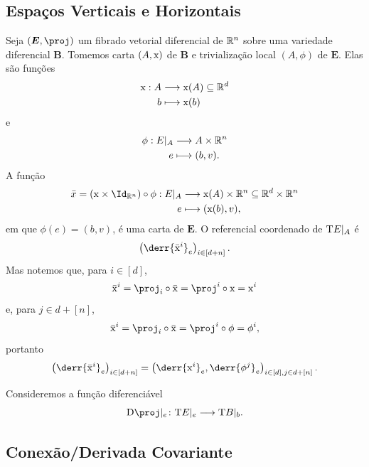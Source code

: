 \subsection{Espaços Verticais e Horizontais}

Seja $(\bm E,\proj)$ um fibrado vetorial diferencial de $\mathbb{R}^n$ sobre uma variedade diferencial $\bm B$. Tomemos carta $(A,\mathrm{x})$ de $\bm B$ e trivialização local $(A,\phi)$ de $\bm E$. Elas são funções
	\begin{align*}
	{\mathrm{x}}: {A} &\longrightarrow {\mathrm{x}(A) \subseteq \mathbb{R}^d} \\{b} &\longmapsto {\mathrm{x}(b)}
	\end{align*}
e
	\begin{align*}
	{\phi}: {E|_A} &\longrightarrow {A \times \mathbb{R}^n} \\{e} &\longmapsto {(b,v)}.
	\end{align*}
A função
	\begin{align*}
	\func{\bar x = (\x \times \Id_{\R^n}) \circ \phi}{E|_A}{\x(A) \times \R^n \subseteq \R^d \times \R^n}{e}{(\x(b),v)},
	\end{align*}
em que $\phi(e) = (b,v)$, é uma carta de $\bm E$. O referencial coordenado de $\mathrm{T} E|_A$ é
	\begin{equation*}
	\left( \derr{\bar \x^i}_e \right)_{i \in [d+n]}.
	\end{equation*}
Mas notemos que, para $i \in [d]$,
	\begin{equation*}
	\bar \x^i = \proj_i \circ \bar \x = \proj^i \circ \x = \x^i
	\end{equation*}
e, para $j \in d+[n]$,
	\begin{equation*}
	\bar \x^i = \proj_i \circ \bar \x = \proj^i \circ \phi = \phi^i,
	\end{equation*}
portanto
	\begin{equation*}
	\left( \derr{\bar \x^i}_e \right)_{i \in [d+n]} = \left( \derr{\x^i}_e, \derr{\phi^j}_e \right)_{i \in [d], j \in d+[n]}.
	\end{equation*}

Consideremos a função diferenciável
	\begin{equation*}
	\D \proj|_e \colon \Tg E|_e \to \Tg B|_b.
	\end{equation*}

















\subsection{Conexão/Derivada Covariante}

